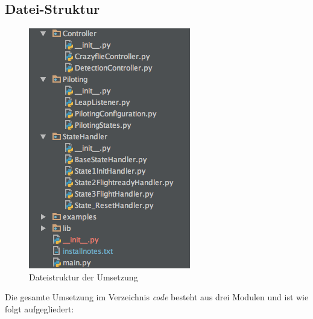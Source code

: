 \subsection{Datei-Struktur}
\begin{figure}
	\includegraphics[width=1.0\linewidth]{figures/poc/filestructure.png}
	\caption{Dateistruktur der Umsetzung}
\end{figure}
Die gesamte Umsetzung im Verzeichnis \textit{code} besteht aus drei Modulen und ist wie folgt aufgegliedert:

